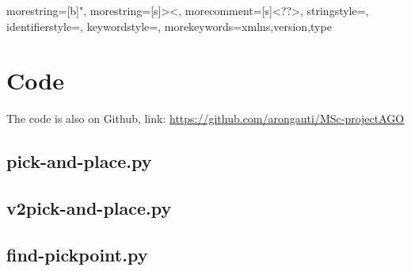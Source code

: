 


{
  morestring=[b]",
  morestring=[s]{>}{<},
  morecomment=[s]{<?}{?>},
  stringstyle=\color{black},
  identifierstyle=\color{darkblue},
  keywordstyle=\color{cyan},
  morekeywords={xmlns,version,type}%
}
\appendix



\chapter{Code}  \label{app:code}
The code is also on Github, link: \url{https://github.com/arongauti/MSc-projectAGO}
\section{pick-and-place.py}\label{sec:pickandplace}

\pagebreak

\section{v2pick-and-place.py}\label{sec:v2pickandplace}

\pagebreak

\section{find-pickpoint.py}\label{sec:findpickpoint}

\pagebreak

